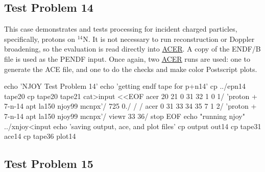 \subsection{Test Problem 14}
\label{ssMandT_14}

This case demonstrates and tests processing for incident charged
particles, specifically, protons on $^{14}$N.  It is not
necessary to run reconstruction or Doppler broadening, so
the evaluation is read directly into
\hyperlink{sACERhy}{ACER}.  A copy of the
ENDF/B file is used as the PENDF input.  Once again, two
\hyperlink{sACERhy}{ACER} runs are used: one to generate the ACE
file, and one to do the checks and make color Postscript plots.

\small
\begin{ccode}

echo 'NJOY Test Problem 14'
echo 'getting endf tape for p+n14'
cp ../epn14 tape20
cp tape20 tape21
cat>input <<EOF
 acer
 20 21 0 31 32
 1 0 1/
 'proton + 7-n-14 apt la150 njoy99 mcnpx'/
 725 0./
 /
 /
 acer
 0 31 33 34 35
 7 1 2/
 'proton + 7-n-14 apt la150 njoy99 mcnpx'/
 viewr
 33 36/
 stop
EOF
echo "running njoy"
../xnjoy<input
echo 'saving output, ace, and plot files'
cp output out14
cp tape31 ace14
cp tape36 plot14

\end{ccode}
\normalsize

\subsection{Test Problem 15}
\label{ssMandT_15}

